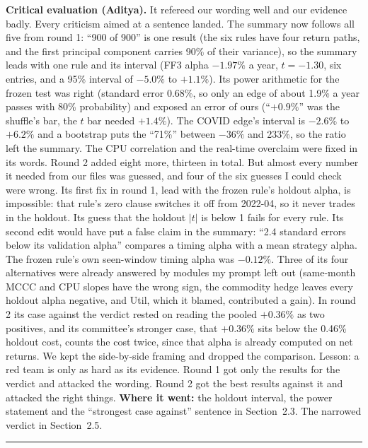 \textbf{Critical evaluation (Aditya).} It refereed our wording well and our evidence badly. Every criticism aimed at a sentence landed. The summary now follows all five from round 1: ``900 of 900'' is one result (the six rules have four return paths, and the first principal component carries 90\% of their variance), so the summary leads with one rule and its interval (FF3 alpha $-1.97\%$ a year, $t=-1.30$, six entries, and a 95\% interval of $-5.0\%$ to $+1.1\%$). Its power arithmetic for the frozen test was right (standard error 0.68\%, so only an edge of about 1.9\% a year passes with 80\% probability) and exposed an error of ours (``$+0.9\%$'' was the shuffle's bar, the $t$ bar needed $+1.4\%$). The COVID edge's interval is $-2.6\%$ to $+6.2\%$ and a bootstrap puts the ``71\%'' between $-36\%$ and 233\%, so the ratio left the summary. The CPU correlation and the real-time overclaim were fixed in its words. Round 2 added eight more, thirteen in total. But almost every number it needed from our files was guessed, and four of the six guesses I could check were wrong. Its first fix in round 1, lead with the frozen rule's holdout alpha, is impossible: that rule's zero clause switches it off from 2022-04, so it never trades in the holdout. Its guess that the holdout $|t|$ is below 1 fails for every rule. Its second edit would have put a false claim in the summary: ``2.4 standard errors below its validation alpha'' compares a timing alpha with a mean strategy alpha. The frozen rule's own seen-window timing alpha was $-0.12\%$. Three of its four alternatives were already answered by modules my prompt left out (same-month MCCC and CPU slopes have the wrong sign, the commodity hedge leaves every holdout alpha negative, and Util, which it blamed, contributed a gain). In round 2 its case against the verdict rested on reading the pooled $+0.36\%$ as two positives, and its committee's stronger case, that $+0.36\%$ sits below the 0.46\% holdout cost, counts the cost twice, since that alpha is already computed on net returns. We kept the side-by-side framing and dropped the comparison. Lesson: a red team is only as hard as its evidence. Round 1 got only the results for the verdict and attacked the wording. Round 2 got the best results against it and attacked the right things. \textbf{Where it went:} the holdout interval, the power statement and the ``strongest case against'' sentence in Section~2.3. The narrowed verdict in Section~2.5.

\begin{center}\rule{0.5\linewidth}{0.5pt}\end{center}

